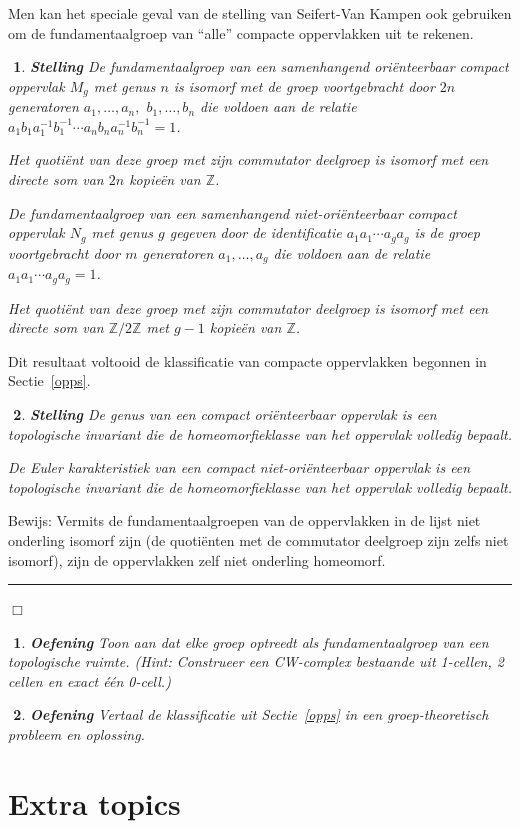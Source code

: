 \documentclass[12pt]{book}
\newcommand{\Z}{\mathbb{Z}}
\newcommand{\bew}{{\sc Bewijs: }}
\newcommand{\B}{\rule{1mm}{0mm} \hfill $\Box$ }
\newtheorem{stelh}{$\!\!$}[section]
\newenvironment{stel}{\begin{stelh}{\em {\bf Stelling }}}{\end{stelh}}
\newtheorem{eoef}{$\!\!$}[chapter]
\newenvironment{oef}{\begin{eoef} {\bf Oefening}}{\end{eoef}}
\begin{document}
Men kan het speciale geval van de stelling van Seifert-Van Kampen ook gebruiken om de fundamentaalgroep van
``alle'' compacte oppervlakken uit te rekenen.
\begin{stel}\label{klass}
De fundamentaalgroep van een samenhangend ori\"enteerbaar compact oppervlak $M_g$ met genus $n$ is isomorf met
de groep voortgebracht door $2n$ generatoren $a_1, \ldots , a_n,$ $b_1, \ldots , b_n$ die voldoen aan de relatie
$a_1b_1a_{1}^{-1}b_{1}^{-1}\cdots a_nb_na_{n}^{-1}b_{n}^{-1}=1$. 

Het quoti\"ent van deze groep met zijn commutator deelgroep is isomorf met een directe som van $2n$ kopie\"en van $\Z$. 


De fundamentaalgroep van een samenhangend niet-ori\"enteerbaar compact oppervlak $N_g$ met genus $g$ gegeven door de identificatie
$a_1a_1\cdots a_ga_g$ is 
de groep voortgebracht door $m$ generatoren $a_1, \ldots , a_g$ die voldoen aan de relatie
$a_1a_1\cdots a_ga_g=1$.

Het quoti\"ent van deze groep met zijn commutator deelgroep is isomorf met een directe som van  $\Z/2\Z$ met $g-1$ kopie\"en van $\Z$.  
\end{stel}
Dit resultaat voltooid de klassificatie van compacte oppervlakken begonnen in Sectie~\ref{opps}. 
\begin{stel} De genus van een compact ori\"enteerbaar oppervlak is een topologische invariant die de homeomorfieklasse van het oppervlak volledig bepaalt.

De Euler karakteristiek van een compact niet-ori\"enteerbaar oppervlak is een topologische invariant die de homeomorfieklasse van het oppervlak volledig bepaalt.
\end{stel}
\bew Vermits de fundamentaalgroepen van de oppervlakken in de lijst niet onderling isomorf zijn (de quoti\"enten met de commutator deelgroep zijn zelfs niet isomorf), zijn de oppervlakken zelf niet onderling homeomorf.\B


\begin{oef}
Toon aan dat elke groep optreedt als fundamentaalgroep van een topologische ruimte. (Hint: Construeer een CW-complex bestaande uit 1-cellen, 2 cellen en exact \'e\'en 0-cell.)
\end{oef}

\begin{oef}
Vertaal de klassificatie uit Sectie~\ref{opps} in een groep-theoretisch probleem en oplossing.
\end{oef}

\section{Extra topics}
\end{document}
